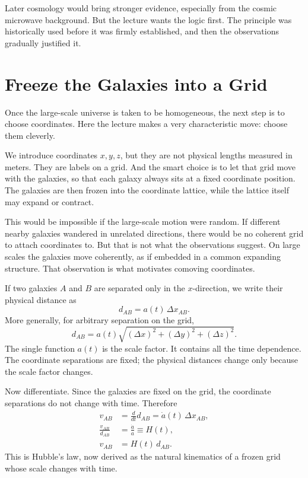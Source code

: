 Later cosmology would bring stronger evidence, especially from the cosmic microwave background. But the lecture wants the logic first. The principle was historically used before it was firmly established, and then the observations gradually justified it.

\section{Freeze the Galaxies into a Grid}

Once the large-scale universe is taken to be homogeneous, the next step is to choose coordinates. Here the lecture makes a very characteristic move: choose them cleverly.

We introduce coordinates \(x,y,z\), but they are not physical lengths measured in meters. They are labels on a grid. And the smart choice is to let that grid move with the galaxies, so that each galaxy always sits at a fixed coordinate position. The galaxies are then frozen into the coordinate lattice, while the lattice itself may expand or contract.

This would be impossible if the large-scale motion were random. If different nearby galaxies wandered in unrelated directions, there would be no coherent grid to attach coordinates to. But that is not what the observations suggest. On large scales the galaxies move coherently, as if embedded in a common expanding structure. That observation is what motivates comoving coordinates.

If two galaxies \(A\) and \(B\) are separated only in the \(x\)-direction, we write their physical distance as
\begin{equation}
d_{AB}=a(t)\,\Delta x_{AB}.
\end{equation}
More generally, for arbitrary separation on the grid,
\begin{equation}
d_{AB}=a(t)\sqrt{(\Delta x)^2+(\Delta y)^2+(\Delta z)^2}.
\end{equation}
The single function \(a(t)\) is the scale factor. It contains all the time dependence. The coordinate separations are fixed; the physical distances change only because the scale factor changes.

Now differentiate. Since the galaxies are fixed on the grid, the coordinate separations do not change with time. Therefore
\begin{align}
v_{AB}&=\frac{d}{dt}d_{AB}=\dot a(t)\,\Delta x_{AB},\\
\frac{v_{AB}}{d_{AB}}&=\frac{\dot a}{a}\equiv H(t),\\
v_{AB}&=H(t)\,d_{AB}.
\end{align}
This is Hubble's law, now derived as the natural kinematics of a frozen grid whose scale changes with time.


